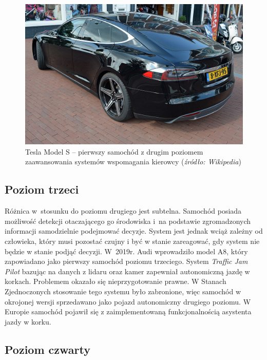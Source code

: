 \begin{figure}
  \centering
  \includegraphics[width=12cm]{img/tesla.jpg}
  \caption{Tesla Model S -- pierwszy samochód z drugim poziomem zaawansowania systemów wspomagania kierowcy (\textit{źródło: Wikipedia})}
  \label{fig:teslas}
\end{figure}

\subsection{Poziom trzeci}

Różnica w~stosunku do poziomu drugiego jest subtelna. %
Samochód posiada możliwość detekcji otaczającego go środowiska i~na podstawie zgromadzonych informacji samodzielnie podejmować decyzje. %
System jest jednak wciąż zależny od człowieka, który musi pozostać czujny i być w stanie zareagować, gdy system nie będzie w stanie podjąć decyzji. 
W~2019r. Audi wprowadziło model A8, który zapowiadano jako pierwszy samochód poziomu trzeciego. 
System \textit{Traffic Jam Pilot} bazując na danych z lidaru oraz kamer zapewniał autonomiczną jazdę w korkach. 
Problemem okazało się nieprzygotowanie prawne. %
W Stanach Zjednoczonych stosowanie tego systemu było zabronione, więc samochód w okrojonej wersji sprzedawano jako pojazd autonomiczny drugiego poziomu. 
W Europie samochód pojawił się z zaimplementowaną funkcjonalnością asystenta jazdy w korku. %

\subsection{Poziom czwarty}

